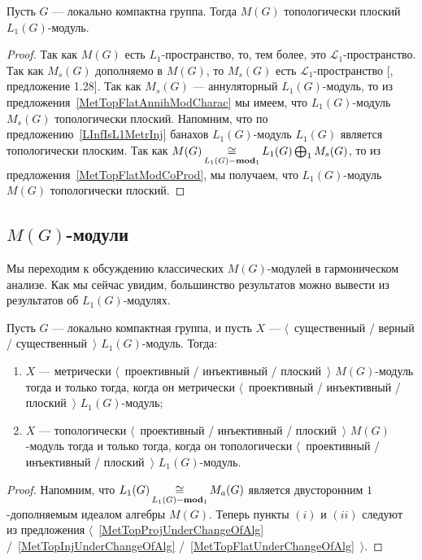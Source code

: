 \begin{proposition}\label{MeasAlgIsL1TopFlat} Пусть $G$ --- локально компактна
группа. Тогда $M(G)$ топологически плоский $L_1(G)$-модуль.
\end{proposition}
\begin{proof} Так как $M(G)$ есть $L_1$-пространство, то, тем более, это
$\mathscr{L}_1$-пространство. Так как $M_s(G)$ дополняемо в $M(G)$, то $M_s(G)$
есть $\mathscr{L}_1$-пространство [\cite{BourgNewClOfLpSp}, предложение 1.28].
Так как $M_s(G)$ --- аннуляторный $L_1(G)$-модуль, то из
предложения~\ref{MetTopFlatAnnihModCharac} мы имеем, что $L_1(G)$-модуль
$M_s(G)$ топологически плоский. Напомним, что по
предложению~\ref{LInfIsL1MetrInj} банахов $L_1(G)$-модуль $L_1(G)$ является
топологически плоским. Так как
$M(G)\mathop{\mathbin{\cong}}\limits_{L_1(G)-\mathbf{mod}_1}L_1(G)\bigoplus_1 M_s(G)$, то из
предложения~\ref{MetTopFlatModCoProd}, мы получаем, что $L_1(G)$-модуль $M(G)$
топологически плоский.
\end{proof}


\subsection{
    \texorpdfstring{$M(G)$}{M (G)}-модули}\label{SubSectionMGModules}

Мы переходим к обсуждению классических $M(G)$-модулей в гармоническом анализе.
Как мы сейчас увидим, большинство результатов можно вывести из результатов об
$L_1(G)$-модулях.

\begin{proposition}\label{MGMetTopProjInjFlatRedToL1} Пусть $G$ --- локально
компактная группа, и пусть $X$ --- $\langle$~существенный / верный /
существенный~$\rangle$ $L_1(G)$-модуль. Тогда:

\begin{enumerate}[label = (\roman*)]
    \item $X$ --- метрически 
    $\langle$~проективный / инъективный / плоский~$\rangle$
    $M(G)$-модуль тогда и только тогда, когда он метрически 
    $\langle$~проективный / инъективный / плоский~$\rangle$ $L_1(G)$-модуль;

    \item $X$ --- топологически 
    $\langle$~проективный / инъективный / плоский~$\rangle$ 
    $M(G)$-модуль тогда и только тогда, когда он топологически
    $\langle$~проективный / инъективный / плоский~$\rangle$ $L_1(G)$-модуль.
\end{enumerate}
\end{proposition}
\begin{proof} Напомним, что $L_1(G)\mathop{\mathbin{\cong}}\limits_{L_1(G)-\mathbf{mod}_1}M_a(G)$ является
двусторонним $1$-дополняемым идеалом алгебры $M(G)$. Теперь пункты $(i)$ и 
$(ii)$ следуют из предложения $\langle$~\ref{MetTopProjUnderChangeOfAlg}
/~\ref{MetTopInjUnderChangeOfAlg}  /~\ref{MetTopFlatUnderChangeOfAlg}~$\rangle$.
\end{proof} 

